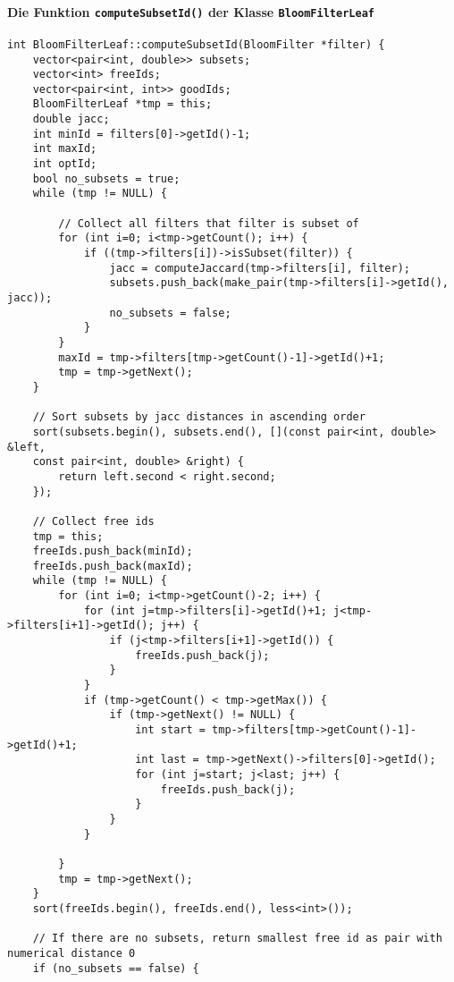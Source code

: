 \paragraph*{Die Funktion \texttt{computeSubsetId()} der Klasse \texttt{BloomFilterLeaf}}\small{
\begin{verbatim}
int BloomFilterLeaf::computeSubsetId(BloomFilter *filter) {
    vector<pair<int, double>> subsets;
    vector<int> freeIds;
    vector<pair<int, int>> goodIds;
    BloomFilterLeaf *tmp = this;
    double jacc;
    int minId = filters[0]->getId()-1;
    int maxId;
    int optId;
    bool no_subsets = true;
    while (tmp != NULL) {
        
        // Collect all filters that filter is subset of
        for (int i=0; i<tmp->getCount(); i++) {
            if ((tmp->filters[i])->isSubset(filter)) {
                jacc = computeJaccard(tmp->filters[i], filter);
                subsets.push_back(make_pair(tmp->filters[i]->getId(), jacc));
                no_subsets = false;
            }
        }
        maxId = tmp->filters[tmp->getCount()-1]->getId()+1;
        tmp = tmp->getNext();
    }
    
    // Sort subsets by jacc distances in ascending order
    sort(subsets.begin(), subsets.end(), [](const pair<int, double> &left, 
    const pair<int, double> &right) {
        return left.second < right.second;
    });
    
    // Collect free ids
    tmp = this;
    freeIds.push_back(minId);
    freeIds.push_back(maxId);
    while (tmp != NULL) {
        for (int i=0; i<tmp->getCount()-2; i++) {
            for (int j=tmp->filters[i]->getId()+1; j<tmp->filters[i+1]->getId(); j++) {
                if (j<tmp->filters[i+1]->getId()) {
                    freeIds.push_back(j);
                }
            }
            if (tmp->getCount() < tmp->getMax()) {
                if (tmp->getNext() != NULL) {
                    int start = tmp->filters[tmp->getCount()-1]->getId()+1;
                    int last = tmp->getNext()->filters[0]->getId();
                    for (int j=start; j<last; j++) {
                        freeIds.push_back(j);
                    }
                }
            }
            
        }
        tmp = tmp->getNext();
    }
    sort(freeIds.begin(), freeIds.end(), less<int>());
    
    // If there are no subsets, return smallest free id as pair with numerical distance 0
    if (no_subsets == false) {
        

\end{verbatim}}
